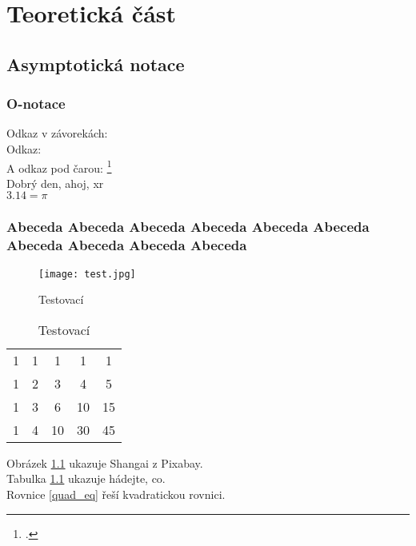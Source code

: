 \part{Teoretická část}

\chapter{Asymptotická notace}

\section{O-notace}
Odkaz v závorekách: \cite[see][page 900]{einstein}\\
Odkaz: \cite{knuthwebsite}\\
A odkaz pod čarou: \footcite[see][s. 42]{latexcompanion}\\
Dobrý den, ahoj, \gls{xr}\\
$3.14 = \pi$

\section{Abeceda Abeceda Abeceda Abeceda Abeceda Abeceda Abeceda Abeceda Abeceda Abeceda }
\begin{figure}
    \texttt{[image: test.jpg]}
    \caption{Testovací}
    \label{fig:test}
\end{figure}
\begin{table}
    \caption{Testovací}
    \label{tab:test2}
    \begin{tabular}{ccccc}
        1 & 1 & 1  & 1  & 1  \\
        1 & 2 & 3  & 4  & 5  \\
        1 & 3 & 6  & 10 & 15 \\
        1 & 4 & 10 & 30 & 45
    \end{tabular}
\end{table}

Obrázek \ref{fig:test} ukazuje Shangai z Pixabay.\\
Tabulka \ref{tab:test2} ukazuje hádejte, co.\\
Rovnice \ref{quad_eq} řeší kvadratickou rovnici.